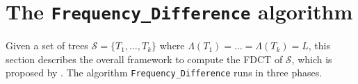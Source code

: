 \documentclass[final,1p,times]{elsarticle}
\newcommand{\compatible}{\smile}
\newcommand{\leafset}{\Lambda}
\newtheorem{lemma}[theorem]{Lemma}
\begin{document}

%
%
%

    \section{The \texttt{Frequency\_Difference} algorithm}
    \label{sec_freq_diff_algo}

    Given a set of trees $\mathcal{S} = \{ T_1, \ldots, T_k \}$ where $\Lambda(T_1) = \ldots = \Lambda(T_k) = L$, this section describes the overall framework to compute the FDCT of $\mathcal{S}$, which is proposed by \cite{jansson2018algorithms}.
    The algorithm \texttt{Frequency\_Difference} runs in three phases.
\end{document}
